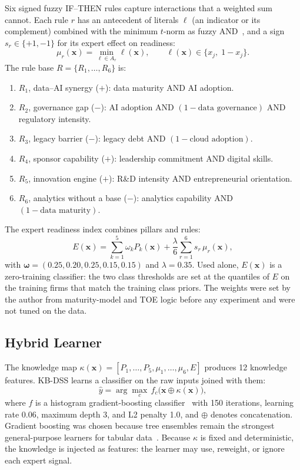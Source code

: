 \documentclass[10pt,journal,compsoc]{IEEEtran}
\begin{document}
Six signed fuzzy IF--THEN rules capture interactions that a weighted sum cannot. Each rule \(r\) has an antecedent of literals \(\ell\) (an indicator or its complement) combined with the minimum \(t\)-norm as fuzzy AND~\cite{zadeh1965,zadeh1973}, and a sign \(s_r\in\{+1,-1\}\) for its expert effect on readiness:
\begin{equation}
\mu_r(\mathbf{x})
=
\min_{\ell\in A_r}\ell(\mathbf{x}),
\qquad
\ell(\mathbf{x})\in\{x_j,\;1-x_j\}.
\label{eq:rule}
\end{equation}
The rule base \(R=\{R_1,\ldots,R_6\}\) is:
\begin{enumerate}
\item \(R_1\), data--AI synergy (\(+\)): data maturity AND AI adoption.
\item \(R_2\), governance gap (\(-\)): AI adoption AND \((1-\text{data governance})\) AND regulatory intensity.
\item \(R_3\), legacy barrier (\(-\)): legacy debt AND \((1-\text{cloud adoption})\).
\item \(R_4\), sponsor capability (\(+\)): leadership commitment AND digital skills.
\item \(R_5\), innovation engine (\(+\)): R\&D intensity AND entrepreneurial orientation.
\item \(R_6\), analytics without a base (\(-\)): analytics capability AND \((1-\text{data maturity})\).
\end{enumerate}
The expert readiness index combines pillars and rules:
\begin{equation}
E(\mathbf{x})
=
\sum_{k=1}^{5}\omega_k P_k(\mathbf{x})
+
\frac{\lambda}{6}\sum_{r=1}^{6}s_r\,\mu_r(\mathbf{x}),
\label{eq:index}
\end{equation}
with \(\boldsymbol{\omega}=(0.25,0.20,0.25,0.15,0.15)\) and \(\lambda=0.35\). Used alone, \(E(\mathbf{x})\) is a zero-training classifier: the two class thresholds are set at the quantiles of \(E\) on the training firms that match the training class priors. The weights were set by the author from maturity-model and TOE logic before any experiment and were not tuned on the data.

\subsection{Hybrid Learner}

The knowledge map \(\kappa(\mathbf{x})=[P_1,\ldots,P_5,\mu_1,\ldots,\mu_6,E]\) produces 12 knowledge features. KB-DSS learns a classifier on the raw inputs joined with them:
\begin{equation}
\hat{y}
=
\arg\max_{c}\,
f_c\bigl(\mathbf{x}\oplus\kappa(\mathbf{x})\bigr),
\label{eq:hybrid}
\end{equation}
where \(f\) is a histogram gradient-boosting classifier~\cite{friedman2001,pedregosa2011} with 150 iterations, learning rate 0.06, maximum depth 3, and L2 penalty 1.0, and \(\oplus\) denotes concatenation. Gradient boosting was chosen because tree ensembles remain the strongest general-purpose learners for tabular data~\cite{grinsztajn2022}. Because \(\kappa\) is fixed and deterministic, the knowledge is injected as features: the learner may use, reweight, or ignore each expert signal.
\end{document}
